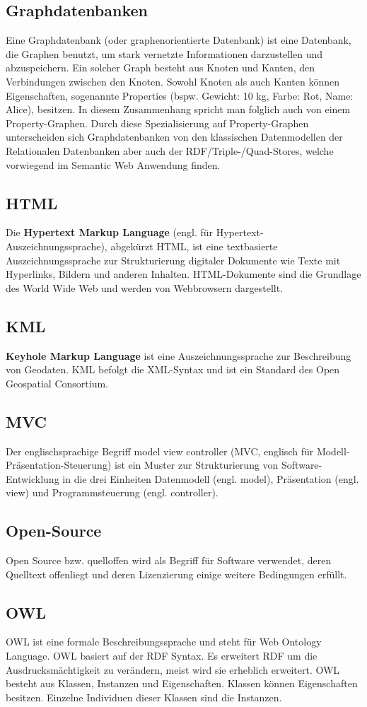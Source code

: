 \documentclass[11pt,a4paper]{article}
\begin{document}
\subsection{Graphdatenbanken}
Eine Graphdatenbank (oder graphenorientierte Datenbank) ist eine Datenbank, die Graphen benutzt, um stark vernetzte Informationen darzustellen und abzuspeichern. Ein solcher Graph besteht aus Knoten und Kanten, den Verbindungen zwischen den Knoten. Sowohl Knoten als auch Kanten können Eigenschaften, sogenannte Properties (bspw. Gewicht: 10 kg, Farbe: Rot, Name: Alice), besitzen. In diesem Zusammenhang spricht man folglich auch von einem Property-Graphen. Durch diese Spezialisierung auf Property-Graphen unterscheiden sich Graphdatenbanken von den klassischen Datenmodellen der Relationalen Datenbanken aber auch der RDF/Triple-/Quad-Stores, welche vorwiegend im Semantic Web Anwendung finden.
\subsection{HTML}
Die \textbf{Hypertext Markup Language} (engl. für Hypertext-Auszeichnungssprache), abgekürzt HTML, ist eine textbasierte Auszeichnungssprache zur Strukturierung digitaler Dokumente wie Texte mit Hyperlinks, Bildern und anderen Inhalten. HTML-Dokumente sind die Grundlage des World Wide Web und werden von Webbrowsern dargestellt.
\subsection{KML}
\textbf{Keyhole Markup Language} ist eine Auszeichnungssprache zur Beschreibung von Geodaten. KML befolgt die XML-Syntax und ist ein Standard des Open Geospatial Consortium.
\subsection{MVC}
Der englischsprachige Begriff model view controller (MVC, englisch für Modell-Präsentation-Steuerung) ist ein Muster zur Strukturierung von Software-Entwicklung in die drei Einheiten Datenmodell (engl. model), Präsentation (engl. view) und Programmsteuerung (engl. controller).
\subsection{Open-Source}
Open Source bzw. quelloffen wird als Begriff für Software verwendet, deren Quelltext offenliegt und deren Lizenzierung einige weitere Bedingungen erfüllt.
\subsection{OWL}
OWL ist eine formale Beschreibungssprache und steht für Web Ontology Language. OWL basiert auf der RDF Syntax. Es erweitert RDF um die Ausdrucksmächtigkeit zu verändern, meist wird sie erheblich erweitert. OWL besteht aus Klassen, Instanzen und Eigenschaften. Klassen können Eigenschaften besitzen. Einzelne Individuen dieser Klassen sind die Instanzen.
\end{document}
